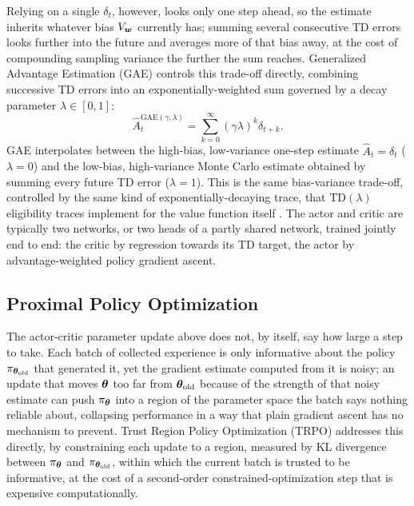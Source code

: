 Relying on a single $\delta_t$, however, looks only one step ahead, so the estimate inherits whatever bias $V_{\bm{w}}$ currently has; summing several consecutive TD errors looks further into the future and averages more of that bias away, at the cost of compounding sampling variance the further the sum reaches. Generalized Advantage Estimation (GAE) \cite{schulman2016gae} controls this trade-off directly, combining successive TD errors into an exponentially-weighted sum governed by a decay parameter $\lambda \in [0,1]$:
\begin{equation}
\hat A_t^{\mathrm{GAE}(\gamma,\lambda)} = \sum_{k=0}^{\infty} (\gamma\lambda)^k \delta_{t+k}.
\end{equation}
GAE interpolates between the high-bias, low-variance one-step estimate $\hat A_t = \delta_t$ ($\lambda{=}0$) and the low-bias, high-variance Monte Carlo estimate obtained by summing every future TD error ($\lambda{=}1$). This is the same bias-variance trade-off, controlled by the same kind of exponentially-decaying trace, that $\mathrm{TD}(\lambda)$ eligibility traces implement for the value function itself \cite{suttonbarto2018}. The actor and critic are typically two networks, or two heads of a partly shared network, trained jointly end to end: the critic by regression towards its TD target, the actor by advantage-weighted policy gradient ascent.

\subsection{Proximal Policy Optimization}
\label{subsec:ppo}

The actor-critic parameter update above does not, by itself, say how large a step to take. Each batch of collected experience is only informative about the policy $\pi_{\bm{\theta}_{\mathrm{old}}}$ that generated it, yet the gradient estimate computed from it is noisy; an update that moves $\bm{\theta}$ too far from $\bm{\theta}_{\mathrm{old}}$ because of the strength of that noisy estimate can push $\pi_{\bm{\theta}}$ into a region of the parameter space the batch says nothing reliable about, collapsing performance in a way that plain gradient ascent has no mechanism to prevent. Trust Region Policy Optimization (TRPO) \cite{schulman2015trpo} addresses this directly, by constraining each update to a region, measured by KL divergence between $\pi_{\bm{\theta}}$ and $\pi_{\bm{\theta}_{\mathrm{old}}}$, within which the current batch is trusted to be informative, at the cost of a second-order constrained-optimization step that is expensive computationally.

